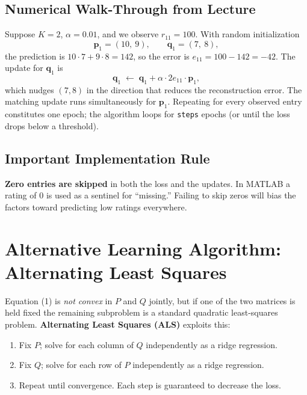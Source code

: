 \documentclass[11pt]{article}
\begin{document}
\subsection{Numerical Walk-Through from Lecture}
Suppose $K = 2$, $\alpha = 0.01$, and we observe $r_{11} = 100$. With random initialization
\[
    \mathbf{p}_1 = (10,\ 9), \qquad \mathbf{q}_1 = (7,\ 8),
\]
the prediction is $10\cdot 7 + 9\cdot 8 = 142$, so the error is $e_{11} = 100 - 142 = -42$. The update for $\mathbf{q}_1$ is
\[
    \mathbf{q}_1 \;\leftarrow\; \mathbf{q}_1 + \alpha \cdot 2 e_{11}\cdot \mathbf{p}_1,
\]
which nudges $(7,8)$ in the direction that reduces the reconstruction error. The matching update runs simultaneously for $\mathbf{p}_1$. Repeating for every observed entry constitutes one epoch; the algorithm loops for \texttt{steps} epochs (or until the loss drops below a threshold).

\subsection{Important Implementation Rule}
\textbf{Zero entries are skipped} in both the loss and the updates. In MATLAB a rating of 0 is used as a sentinel for ``missing.'' Failing to skip zeros will bias the factors toward predicting low ratings everywhere.


\section{Alternative Learning Algorithm: Alternating Least Squares}

Equation (1) is \emph{not convex} in $P$ and $Q$ jointly, but if one of the two matrices is held fixed the remaining subproblem is a standard quadratic least-squares problem. \textbf{Alternating Least Squares (ALS)} exploits this:

\begin{enumerate}
    \item Fix $P$; solve for each column of $Q$ independently as a ridge regression.
    \item Fix $Q$; solve for each row of $P$ independently as a ridge regression.
    \item Repeat until convergence. Each step is guaranteed to decrease the loss.
\end{enumerate}
\end{document}
